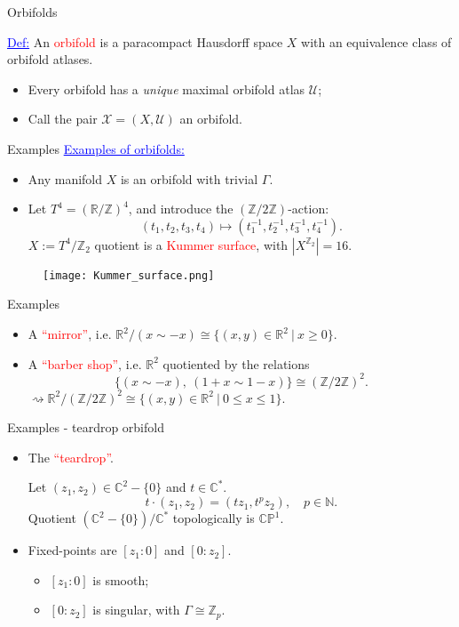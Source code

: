 \documentclass[aspectratio=169,xcolor=dvipsnames]{beamer}
\newcommand{\NN}{\mathbb{N}}
\newcommand{\ZZ}{\mathbb{Z}}
\newcommand{\RR}{\mathbb{R}}
\newcommand{\CC}{\mathbb{C}}
\newcommand{\PP}{\mathbb{P}}
\begin{document}
\begin{frame}{Orbifolds}
    
	\textcolor{blue}{\underline{Def:}} An \textcolor{red}{orbifold} is a paracompact Hausdorff space $X$ with an equivalence class of orbifold atlases.
	\begin{itemize}
		\item Every orbifold has a \emph{unique} maximal orbifold atlas $\mathcal{U}$;
		\item Call the pair $\mathcal{X} = (X, \mathcal{U})$ an orbifold.
	\end{itemize}
\end{frame}

\begin{frame}{Examples}
	\textcolor{blue}{\underline{Examples of orbifolds:}}
	\begin{itemize}
		\item Any manifold $X$ is an orbifold with trivial $\Gamma$.
		\item Let $T^{4} = (\RR/\ZZ)^{4}$, and introduce the $(\ZZ/2\ZZ)$-action:
		\[
		(t_{1}, t_{2}, t_{3}, t_{4}) \mapsto (t_{1}^{-1}, t_{2}^{-1}, t_{3}^{-1}, t_{4}^{-1}).
		\]
		$X := T^{4}/\ZZ_{2}$ quotient is a \textcolor{red}{Kummer surface}, with $|X^{\ZZ_{2}}| = 16$.
	\end{itemize}
    \begin{figure}
        \centering
        \texttt{[image: Kummer\_surface.png]}
    \end{figure}
\end{frame}

\begin{frame}{Examples}
	\begin{itemize}
		\item A \textcolor{red}{``mirror''}, i.e. $\RR^{2}/(x \sim -x) \cong \{(x,y) \in \RR^{2}\ |\ x \geq 0\}$.
		\hfill \break
		\item A \textcolor{red}{``barber shop''}, i.e. $\RR^{2}$ quotiented by the relations
		\[
		\{(x \sim -x),\ (1 + x \sim 1 - x)\} \cong (\ZZ/2\ZZ)^{2}.
		\]
		$\rightsquigarrow \RR^{2} / (\ZZ/2\ZZ)^{2} \cong \{(x,y) \in \RR^{2}\ |\ 0 \leq x \leq 1 \}$.
	\end{itemize}
\end{frame}

\begin{frame}{Examples - teardrop orbifold}
	\begin{itemize}
		\item The \textcolor{red}{``teardrop''}.
		
		Let $(z_{1}, z_{2}) \in \CC^{2} - \{0\}$ and $t \in \CC^{\ast}$.
		\[
		t \cdot (z_{1}, z_{2}) = (tz_{1}, t^{p}z_{2}), \quad p \in \NN.
		\]
		Quotient $\left(\CC^{2} - \{0\}\right)/\CC^{\ast}$ topologically is $\CC\PP^{1}$.
		\hfill \break
		\item Fixed-points are $[z_{1}:0]$ and $[0:z_{2}]$.
		\begin{itemize}
			\item $[z_{1}:0]$ is smooth;
			\item $[0:z_{2}]$ is singular, with $\Gamma \cong \ZZ_{p}$.
		\end{itemize}
	\end{itemize}
\end{frame}
\end{document}
